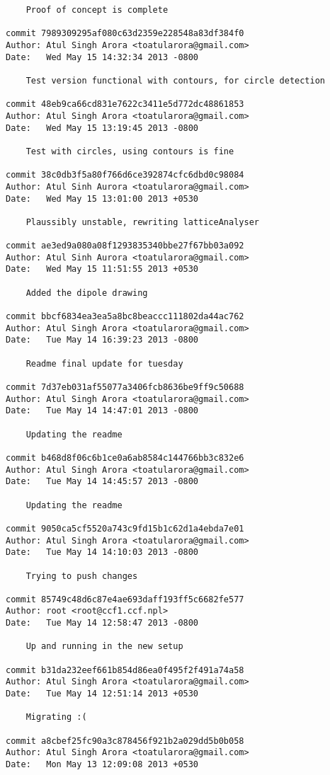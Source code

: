 \begin{lstlisting}
    Proof of concept is complete

commit 7989309295af080c63d2359e228548a83df384f0
Author: Atul Singh Arora <toatularora@gmail.com>
Date:   Wed May 15 14:32:34 2013 -0800

    Test version functional with contours, for circle detection

commit 48eb9ca66cd831e7622c3411e5d772dc48861853
Author: Atul Singh Arora <toatularora@gmail.com>
Date:   Wed May 15 13:19:45 2013 -0800

    Test with circles, using contours is fine

commit 38c0db3f5a80f766d6ce392874cfc6dbd0c98084
Author: Atul Sinh Aurora <toatularora@gmail.com>
Date:   Wed May 15 13:01:00 2013 +0530

    Plaussibly unstable, rewriting latticeAnalyser

commit ae3ed9a080a08f1293835340bbe27f67bb03a092
Author: Atul Sinh Aurora <toatularora@gmail.com>
Date:   Wed May 15 11:51:55 2013 +0530

    Added the dipole drawing

commit bbcf6834ea3ea5a8bc8beaccc111802da44ac762
Author: Atul Singh Arora <toatularora@gmail.com>
Date:   Tue May 14 16:39:23 2013 -0800

    Readme final update for tuesday

commit 7d37eb031af55077a3406fcb8636be9ff9c50688
Author: Atul Singh Arora <toatularora@gmail.com>
Date:   Tue May 14 14:47:01 2013 -0800

    Updating the readme

commit b468d8f06c6b1ce0a6ab8584c144766bb3c832e6
Author: Atul Singh Arora <toatularora@gmail.com>
Date:   Tue May 14 14:45:57 2013 -0800

    Updating the readme

commit 9050ca5cf5520a743c9fd15b1c62d1a4ebda7e01
Author: Atul Singh Arora <toatularora@gmail.com>
Date:   Tue May 14 14:10:03 2013 -0800

    Trying to push changes

commit 85749c48d6c87e4ae693daff193ff5c6682fe577
Author: root <root@ccf1.ccf.npl>
Date:   Tue May 14 12:58:47 2013 -0800

    Up and running in the new setup

commit b31da232eef661b854d86ea0f495f2f491a74a58
Author: Atul Singh Arora <toatularora@gmail.com>
Date:   Tue May 14 12:51:14 2013 +0530

    Migrating :(

commit a8cbef25fc90a3c878456f921b2a029dd5b0b058
Author: Atul Singh Arora <toatularora@gmail.com>
Date:   Mon May 13 12:09:08 2013 +0530


\end{lstlisting}
